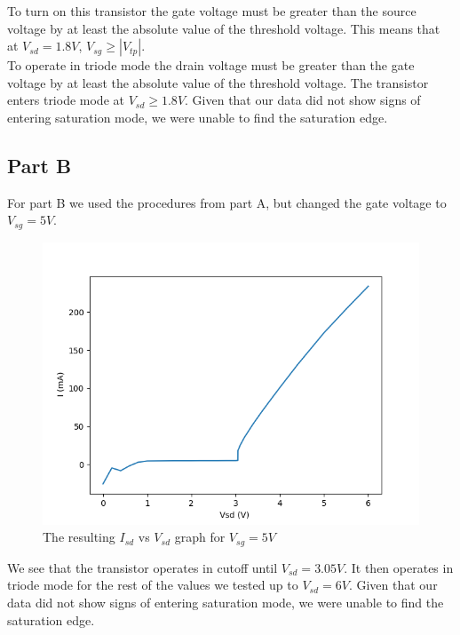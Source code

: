 \FloatBarrier
To turn on this transistor the gate voltage must be greater than the source voltage by at least the absolute value of the threshold voltage. 
This means that at $V_{sd} = 1.8 V$, $V_{sg} \ge |V_{tp}|$.
\\

To operate in triode mode the drain voltage must be greater than the gate voltage by at least the absolute value of the threshold voltage.
The transistor enters triode mode at $ V_{sd} \ge 1.8V$.
Given that our data did not show signs of entering saturation mode, we were unable to find the saturation edge.
\\

\subsection{Part B}
For part B we used the procedures from part A, but changed the gate voltage to $V_{sg} = 5 V$. 

\FloatBarrier

\begin{figure}[h!]
	\centering
	\includegraphics[scale=0.75]{../data/pmos_5v.png}
	\caption{The resulting $I_{sd}$ vs $V_{sd}$ graph for $V_{sg}=5V$}
	\label{fig:pmos_5v}
\end{figure}

\FloatBarrier
We see that the transistor operates in cutoff until $V_{sd} = 3.05 V$.
It then operates in triode mode for the rest of the values we tested up to $V_{sd}=6V$.
Given that our data did not show signs of entering saturation mode, we were unable to find the saturation edge.
